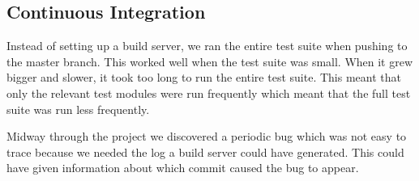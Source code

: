 \subsection{Continuous Integration}
Instead of setting up a build server, we ran the entire test suite when pushing to the master branch. This worked well when the test suite was small. When it grew bigger and slower, it took too long to run the entire test suite. This meant that only the relevant test modules were run frequently which meant that the full test suite was run less frequently.

Midway through the project we discovered a periodic bug which was not easy to trace because we needed the log a build server could have generated. This could have given information about which commit caused the bug to appear.